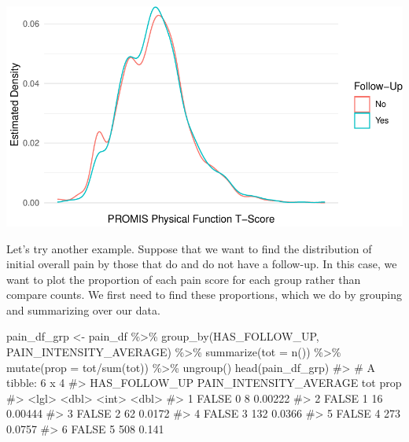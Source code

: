 \documentclass[
  letterpaper,
]{latex/krantz}
\makeatletter
\newenvironment{Shaded}{\begin{snugshade}}{\end{snugshade}}
\newcommand{\AttributeTok}[1]{\textcolor[rgb]{0.40,0.45,0.13}{#1}}
\newcommand{\CommentTok}[1]{\textcolor[rgb]{0.37,0.37,0.37}{#1}}
\newcommand{\FunctionTok}[1]{\textcolor[rgb]{0.28,0.35,0.67}{#1}}
\newcommand{\NormalTok}[1]{\textcolor[rgb]{0.00,0.23,0.31}{#1}}
\newcommand{\OtherTok}[1]{\textcolor[rgb]{0.00,0.23,0.31}{#1}}
\newcommand{\SpecialCharTok}[1]{\textcolor[rgb]{0.37,0.37,0.37}{#1}}
\newenvironment{kframe}{%
\medskip{}
\setlength{\fboxsep}{.8em}
 \def\at@end@of@kframe{}%
 \ifinner\ifhmode%
  \def\at@end@of@kframe{\end{minipage}}%
  \begin{minipage}{\columnwidth}%
 \fi\fi%
 \def\FrameCommand##1{\hskip\@totalleftmargin \hskip-\fboxsep
 \colorbox{shadecolor}{##1}\hskip-\fboxsep
     \hskip-\linewidth \hskip-\@totalleftmargin \hskip\columnwidth}%
 \MakeFramed {\advance\hsize-\width
   \@totalleftmargin\z@ \linewidth\hsize
   \@setminipage}}%
 {\par\unskip\endMakeFramed%
 \at@end@of@kframe}
\renewenvironment{Shaded}{\begin{kframe}}{\end{kframe}}
\makeatother
\begin{document}
\begin{center}
\includegraphics[width=1\textwidth,height=\textheight]{book/visualization_ggplot_files/figure-pdf/unnamed-chunk-16-1.pdf}
\end{center}

Let's try another example. Suppose that we want to find the distribution
of initial overall pain by those that do and do not have a follow-up. In
this case, we want to plot the proportion of each pain score for each
group rather than compare counts. We first need to find these
proportions, which we do by grouping and summarizing over our data.

\begin{Shaded}
\begin{Highlighting}[]
\NormalTok{pain\_df\_grp }\OtherTok{\textless{}{-}}\NormalTok{ pain\_df }\SpecialCharTok{\%\textgreater{}\%}
  \FunctionTok{group\_by}\NormalTok{(HAS\_FOLLOW\_UP, PAIN\_INTENSITY\_AVERAGE) }\SpecialCharTok{\%\textgreater{}\%}
  \FunctionTok{summarize}\NormalTok{(}\AttributeTok{tot =} \FunctionTok{n}\NormalTok{()) }\SpecialCharTok{\%\textgreater{}\%}
  \FunctionTok{mutate}\NormalTok{(}\AttributeTok{prop =}\NormalTok{ tot}\SpecialCharTok{/}\FunctionTok{sum}\NormalTok{(tot)) }\SpecialCharTok{\%\textgreater{}\%}
  \FunctionTok{ungroup}\NormalTok{()}
\FunctionTok{head}\NormalTok{(pain\_df\_grp)}
\CommentTok{\#\textgreater{} \# A tibble: 6 x 4}
\CommentTok{\#\textgreater{}   HAS\_FOLLOW\_UP PAIN\_INTENSITY\_AVERAGE   tot    prop}
\CommentTok{\#\textgreater{}   \textless{}lgl\textgreater{}                          \textless{}dbl\textgreater{} \textless{}int\textgreater{}   \textless{}dbl\textgreater{}}
\CommentTok{\#\textgreater{} 1 FALSE                              0     8 0.00222}
\CommentTok{\#\textgreater{} 2 FALSE                              1    16 0.00444}
\CommentTok{\#\textgreater{} 3 FALSE                              2    62 0.0172 }
\CommentTok{\#\textgreater{} 4 FALSE                              3   132 0.0366 }
\CommentTok{\#\textgreater{} 5 FALSE                              4   273 0.0757 }
\CommentTok{\#\textgreater{} 6 FALSE                              5   508 0.141}
\end{Highlighting}
\end{Shaded}
\end{document}
